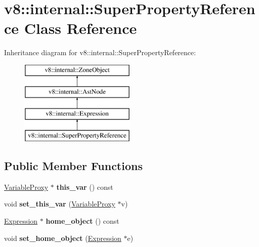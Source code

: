 \hypertarget{classv8_1_1internal_1_1_super_property_reference}{}\section{v8\+:\+:internal\+:\+:Super\+Property\+Reference Class Reference}
\label{classv8_1_1internal_1_1_super_property_reference}
Inheritance diagram for v8\+:\+:internal\+:\+:Super\+Property\+Reference\+:\begin{figure}[H]
\begin{center}
\leavevmode
\includegraphics[height=4.000000cm]{classv8_1_1internal_1_1_super_property_reference}
\end{center}
\end{figure}
\subsection*{Public Member Functions}
\begin{DoxyCompactItemize}
\item 
\hyperlink{classv8_1_1internal_1_1_variable_proxy}{Variable\+Proxy} $\ast$ {\bfseries this\+\_\+var} () const \hypertarget{classv8_1_1internal_1_1_super_property_reference_a9d6381d9b295cd00c9956a201b2ee0ca}{}\label{classv8_1_1internal_1_1_super_property_reference_a9d6381d9b295cd00c9956a201b2ee0ca}

\item 
void {\bfseries set\+\_\+this\+\_\+var} (\hyperlink{classv8_1_1internal_1_1_variable_proxy}{Variable\+Proxy} $\ast$v)\hypertarget{classv8_1_1internal_1_1_super_property_reference_aea60bf8a41ea5627d8f4710a6fa797a4}{}\label{classv8_1_1internal_1_1_super_property_reference_aea60bf8a41ea5627d8f4710a6fa797a4}

\item 
\hyperlink{classv8_1_1internal_1_1_expression}{Expression} $\ast$ {\bfseries home\+\_\+object} () const \hypertarget{classv8_1_1internal_1_1_super_property_reference_a668388d5d7b007d4bd550b56df96ea55}{}\label{classv8_1_1internal_1_1_super_property_reference_a668388d5d7b007d4bd550b56df96ea55}

\item 
void {\bfseries set\+\_\+home\+\_\+object} (\hyperlink{classv8_1_1internal_1_1_expression}{Expression} $\ast$e)\hypertarget{classv8_1_1internal_1_1_super_property_reference_a4e326685cb628db993a52d15bee4350e}{}\label{classv8_1_1internal_1_1_super_property_reference_a4e326685cb628db993a52d15bee4350e}

\end{DoxyCompactItemize}
